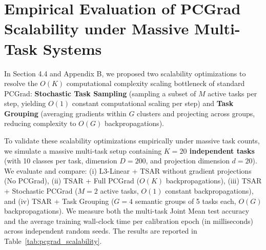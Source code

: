 \section{Empirical Evaluation of PCGrad Scalability under Massive Multi-Task Systems}
\label{sec:pcgrad_scalability}

In Section 4.4 and Appendix B, we proposed two scalability optimizations to resolve the $O(K)$
computational complexity scaling bottleneck of standard PCGrad: \textbf{Stochastic Task Sampling}
(sampling a subset of $M$ active tasks per step, yielding $O(1)$ constant computational scaling per
step) and \textbf{Task Grouping} (averaging gradients within $G$ clusters and projecting across
groups, reducing complexity to $O(G)$ backpropagations).

To validate these scalability optimizations empirically under massive task counts, we simulate a
massive multi-task setup containing \textbf{$K = 20$ independent tasks} (with 10 classes per task,
dimension $D=200$, and projection dimension $d=20$). We evaluate and compare: (i) L3-Linear + TSAR
without gradient projections (No PCGrad), (ii) TSAR + Full PCGrad ($O(K)$ backpropagations), (iii)
TSAR + Stochastic PCGrad ($M=2$ active tasks, $O(1)$ constant backpropagations), and (iv) TSAR +
Task Grouping ($G=4$ semantic groups of 5 tasks each, $O(G)$ backpropagations). We measure both the
multi-task Joint Mean test accuracy and the average training wall-clock time per calibration epoch
(in milliseconds) across independent random seeds. The results are reported in
Table~\ref{tab:pcgrad_scalability}.

